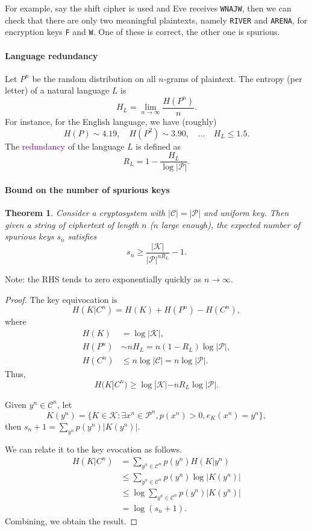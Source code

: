 \documentclass[a4paper, 11pt, openany]{book}
\numberwithin{equation}{section}
\theoremstyle{plain}
\newtheorem{theorem}	[equation]	{Theorem}
\theoremstyle{definition}
\newcommand{\Define}[1]{\textcolor{purple}{#1}}
\newcommand{\alphabet}[1]{\mathcal{#1}}
\begin{document}
For example, say the shift cipher is used and Eve receives \texttt{WNAJW}, then we can check that there are only two meaningful plaintexts, namely \texttt{RIVER} and \texttt{ARENA}, for encryption keys \texttt{F} and \texttt{W}. One of these is correct, the other one is spurious.




\paragraph{Language redundancy}
Let $P^n$ be the random distribution on all $n$-grams of plaintext. The entropy (per letter) of a natural language $L$ is
\[
	H_L = \lim_{n \to \infty} \frac{ H(P^n) }{ n }.
\]
For instance, for the English language, we have (roughly)
\[
	H(P) \sim 4.19, \quad H(P^2) \sim 3.90, \quad  \dots \quad H_L \le 1.5.
\]
The \Define{redundancy} of the language $L$ is defined as
\[
	R_L = 1 - \frac{ H_L }{ \log |\alphabet{P}| }.
\]




\paragraph{Bound on the number of spurious keys}
\begin{theorem}
Consider a cryptosystem with $|\alphabet{C}| = |\alphabet{P}|$ and uniform key. Then given a string of ciphertext of length $n$ ($n$ large enough), the expected number of spurious keys $s_n$ satisfies
\[
	s_n \ge \frac{ |\alphabet{K}| }{ |\alphabet{P}|^{n R_L} } - 1.
\]
\end{theorem}

Note: the RHS tends to zero exponentially quickly as $n \to \infty$.
 

\begin{proof}
The key equivocation is
\[
	H(K | C^n) = H(K) + H(P^n) - H(C^n),
\]
where 
\begin{align*}
	H(K) 	&= 		\log |\alphabet{K}|,\\
	H(P^n) 	&\sim 	n H_L = n (1 - R_L) \log |\alphabet{P}|,\\
	H(C^n) 	&\le 	n \log |\alphabet{C}| = n \log |\alphabet{P}|.
\end{align*}
Thus,
\[
	H(K | C^n) \ge \log |\alphabet{K}| - n R_L \log |\alphabet{P}|.
\]

Given $y^n \in \alphabet{C}^n$, let 
\[
	K(y^n) = \{ K \in \alphabet{K} : \exists x^n \in \alphabet{P}^n, p(x^n) > 0, e_K(x^n) = y^n \},
\]
then $s_n + 1 = \sum_{y^n} p(y^n) |K(y^n)|$.

We can relate it to the key evocation as follows.
\begin{align*}
	H(K | C^n) &= \sum_{y^n \in \alphabet{C}^n} p(y^n) H(K | y^n)\\
	&\le \sum_{y^n \in \alphabet{C}^n} p(y^n) \log |K(y^n)|\\
	&\le \log \sum_{y^n \in \alphabet{C}^n} p(y^n) |K(y^n)|\\
	&= \log (s_n + 1).
\end{align*}
Combining, we obtain the result.

\end{proof}
\end{document}
